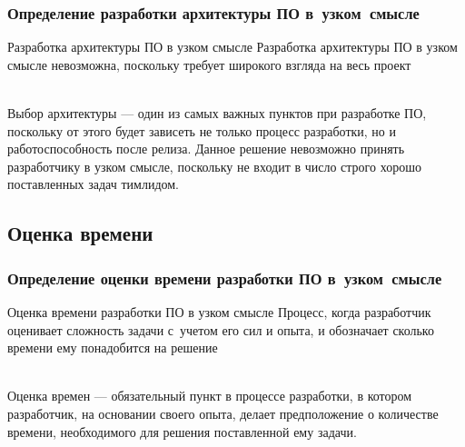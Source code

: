 \documentclass[lecturenotes]{../industrial-development}
\begin{document}
\begin{frame} \frametitle{Определение разработки архитектуры ПО в~узком~смысле}
	\begin{block}{Разработка архитектуры ПО в узком смысле}
		Разработка архитектуры ПО в узком смысле невозможна, поскольку требует широкого взгляда на весь проект
	\end{block}{}	
\end{frame}
\lecturenotes
\\Выбор архитектуры --- один из самых важных пунктов при разработке ПО, поскольку от этого будет зависеть не только процесс разработки, но и работоспособность после релиза. Данное решение невозможно принять разработчику в узком смысле, поскольку не входит в число строго хорошо поставленных задач тимлидом.

\subsection{Оценка времени}
\begin{frame} \frametitle{Определение оценки времени разработки ПО в~узком~смысле}
	\begin{block}{Оценка времени разработки ПО в узком смысле}
		Процесс, когда разработчик оценивает сложность задачи с~учетом его сил и опыта, и обозначает сколько времени ему понадобится на решение
	\end{block}{}
\end{frame}
\lecturenotes
\\Оценка времен --- обязательный пункт в процессе разработки, в котором разработчик, на основании своего опыта, делает предположение о количестве времени, необходимого для решения поставленной ему задачи.
\end{document}

